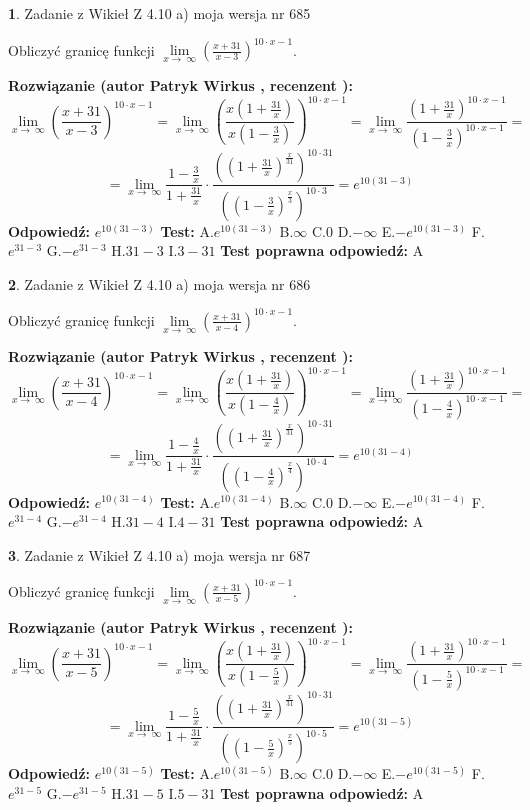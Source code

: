 \documentclass[12pt, a4paper]{article}
\theoremstyle{definition} %
\newtheorem{zad}{}
\newcommand{\zadStart}[1]{\begin{zad}#1\newline}
\newcommand{\zadStop}{\end{zad}}
\newcommand{\rozwStart}[2]{\noindent \textbf{Rozwiązanie (autor #1 , recenzent #2): }\newline}
\newcommand{\rozwStop}{\newline}
\newcommand{\odpStart}{\noindent \textbf{Odpowiedź:}\newline}
\newcommand{\odpStop}{\newline}
\newcommand{\testStart}{\noindent \textbf{Test:}\newline}
\newcommand{\testStop}{\newline}
\newcommand{\kluczStart}{\noindent \textbf{Test poprawna odpowiedź:}\newline}
\newcommand{\kluczStop}{\newline}
\begin{document}
\zadStart{Zadanie z Wikieł Z 4.10 a) moja wersja nr 685}


Obliczyć granicę funkcji  $\lim\limits_{x\to\ \infty}(\frac{x+31}{x-3})^{10\cdot x-1}$.
\zadStop
\rozwStart{Patryk Wirkus}{}
$$\lim\limits_{x\to\ \infty}(\frac{x+31}{x-3})^{10\cdot x-1} = \lim\limits_{x\to\ \infty}(\frac{x(1+\frac{31}{x})}{x(1-\frac{3}{x})})^{10\cdot x-1}=\lim\limits_{x\to\ \infty}\frac{(1+\frac{31}{x})^{10\cdot x-1}}{(1-\frac{3}{x})^{10\cdot x-1}}=$$
$$=\lim\limits_{x\to\ \infty}\frac{1-\frac{3}{x}}{1+\frac{31}{x}}\cdot\frac{((1+\frac{31}{x})^{\frac{x}{31}})^{10\cdot31}}{((1-\frac{3}{x})^{\frac{x}{3}})^{10\cdot3}}=e^{10(31-3)}$$
\rozwStop
\odpStart
$e^{10(31-3)}$
\odpStop
\testStart
A.$e^{10(31-3)}$ B.$\infty$ C.$0$ D.$-\infty$ E.$-e^{10(31-3)}$
F.$e^{31-3}$ G.$-e^{31-3}$
H.$31-3$
I.$3-31$
\testStop
\kluczStart
A
\kluczStop



\zadStart{Zadanie z Wikieł Z 4.10 a) moja wersja nr 686}


Obliczyć granicę funkcji  $\lim\limits_{x\to\ \infty}(\frac{x+31}{x-4})^{10\cdot x-1}$.
\zadStop
\rozwStart{Patryk Wirkus}{}
$$\lim\limits_{x\to\ \infty}(\frac{x+31}{x-4})^{10\cdot x-1} = \lim\limits_{x\to\ \infty}(\frac{x(1+\frac{31}{x})}{x(1-\frac{4}{x})})^{10\cdot x-1}=\lim\limits_{x\to\ \infty}\frac{(1+\frac{31}{x})^{10\cdot x-1}}{(1-\frac{4}{x})^{10\cdot x-1}}=$$
$$=\lim\limits_{x\to\ \infty}\frac{1-\frac{4}{x}}{1+\frac{31}{x}}\cdot\frac{((1+\frac{31}{x})^{\frac{x}{31}})^{10\cdot31}}{((1-\frac{4}{x})^{\frac{x}{4}})^{10\cdot4}}=e^{10(31-4)}$$
\rozwStop
\odpStart
$e^{10(31-4)}$
\odpStop
\testStart
A.$e^{10(31-4)}$ B.$\infty$ C.$0$ D.$-\infty$ E.$-e^{10(31-4)}$
F.$e^{31-4}$ G.$-e^{31-4}$
H.$31-4$
I.$4-31$
\testStop
\kluczStart
A
\kluczStop



\zadStart{Zadanie z Wikieł Z 4.10 a) moja wersja nr 687}


Obliczyć granicę funkcji  $\lim\limits_{x\to\ \infty}(\frac{x+31}{x-5})^{10\cdot x-1}$.
\zadStop
\rozwStart{Patryk Wirkus}{}
$$\lim\limits_{x\to\ \infty}(\frac{x+31}{x-5})^{10\cdot x-1} = \lim\limits_{x\to\ \infty}(\frac{x(1+\frac{31}{x})}{x(1-\frac{5}{x})})^{10\cdot x-1}=\lim\limits_{x\to\ \infty}\frac{(1+\frac{31}{x})^{10\cdot x-1}}{(1-\frac{5}{x})^{10\cdot x-1}}=$$
$$=\lim\limits_{x\to\ \infty}\frac{1-\frac{5}{x}}{1+\frac{31}{x}}\cdot\frac{((1+\frac{31}{x})^{\frac{x}{31}})^{10\cdot31}}{((1-\frac{5}{x})^{\frac{x}{5}})^{10\cdot5}}=e^{10(31-5)}$$
\rozwStop
\odpStart
$e^{10(31-5)}$
\odpStop
\testStart
A.$e^{10(31-5)}$ B.$\infty$ C.$0$ D.$-\infty$ E.$-e^{10(31-5)}$
F.$e^{31-5}$ G.$-e^{31-5}$
H.$31-5$
I.$5-31$
\testStop
\kluczStart
A
\kluczStop
\end{document}
